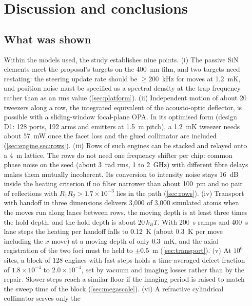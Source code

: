 \section{Discussion and conclusions}\label{sec:discussion}

\subsection{What was shown}\label{sec:discussion-shown}

Within the models used, the study establishes nine points. (i) The passive SiN elements meet the proposal's
targets on the 400~nm film, and two targets need restating: the steering update rate should be $\geq 200$~kHz
for moves at 1.2~mK, and position noise must be specified as a spectral density at the trap frequency rather
than as an rms value (\cref{sec:platform}). (ii) Independent motion of about 20 tweezers along a row, the
integrated equivalent of the acousto-optic deflector, is possible with a sliding-window focal-plane OPA. In
its optimised form (design D1: 128 ports, 192 arms and emitters at 1.5~\textmu m pitch), a 1.2~mK tweezer needs
about 57~mW once the facet loss and the glued collimator are included (\cref{sec:engine,sec:rows}). (iii) Rows of
such engines can be stacked and relayed onto a 4~\textmu m lattice. The rows do not need one frequency shifter
per chip: common phase noise on the seed (about 3~rad rms, 1 to 2~GHz) with different fibre delays makes them
mutually incoherent. Its conversion to intensity noise stays 16~dB inside the heating criterion if no filter
narrower than about 100~pm and no pair of reflections with $R_1R_2>1.7\times10^{-3}$ lies in the path
(\cref{sec:rows}). (iv) Transport with handoff in three dimensions delivers 3,000 of 3,000 simulated atoms when
the moves run along lanes between rows, the moving depth is at least three times the hold depth, and the
hold depth is about $20\,k_BT$. With 200~\textmu s ramps and 400~\textmu s lane steps the heating per handoff
falls to 0.12~\textmu K (about 0.3~\textmu K per move including the $x$ move) at a moving depth of only 0.3~mK, and the axial registration of the two foci
must be held to $\pm0.5$~\textmu m (\cref{sec:transport}). (v) At $10^6$ sites, a block of 128 engines with fast
steps holds a time-averaged defect fraction of $1.8\times10^{-4}$ to $2.0\times10^{-4}$, set by vacuum and
imaging losses rather than by the repair. Slower steps reach a similar floor if the imaging period is raised
to match the sweep time of the block (\cref{sec:megascale}). (vi) A refractive cylindrical collimator serves only the
